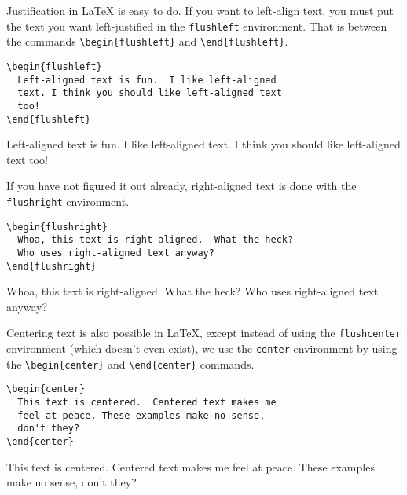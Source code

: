 Justification in \LaTeX{} is easy to do.  If you want to left-align
text, you must put the text you want left-justified in the
\texttt{flushleft} environment.  That is between the commands
\verb=\begin{flushleft}= and \verb=\end{flushleft}=.
\begin{framed}
\begin{verbatim}
\begin{flushleft}
  Left-aligned text is fun.  I like left-aligned
  text. I think you should like left-aligned text
  too!
\end{flushleft}
\end{verbatim}
  \begin{flushleft}
    Left-aligned text is fun.  I like left-aligned text.  I think you
    should like left-aligned text too!
  \end{flushleft}
\end{framed}

If you have not figured it out already, right-aligned text is done
with the \texttt{flushright} environment.
\begin{framed}
\begin{verbatim}
\begin{flushright}
  Whoa, this text is right-aligned.  What the heck?
  Who uses right-aligned text anyway?
\end{flushright}
\end{verbatim}
  \begin{flushright}
    Whoa, this text is right-aligned.  What the heck?  Who uses
    right-aligned text anyway?
  \end{flushright}
\end{framed}

Centering text is also possible in \LaTeX{}, except instead of using
the \texttt{flushcenter} environment (which doesn't even exist), we
use the \texttt{center} environment by using the \verb=\begin{center}=
  and \verb=\end{center}= commands.
\begin{framed}
\begin{verbatim}
\begin{center}
  This text is centered.  Centered text makes me
  feel at peace. These examples make no sense,
  don't they?
\end{center}
\end{verbatim}
  \begin{center}
    This text is centered.  Centered text makes me feel at peace.
    These examples make no sense, don't they?
  \end{center}
\end{framed}
  
